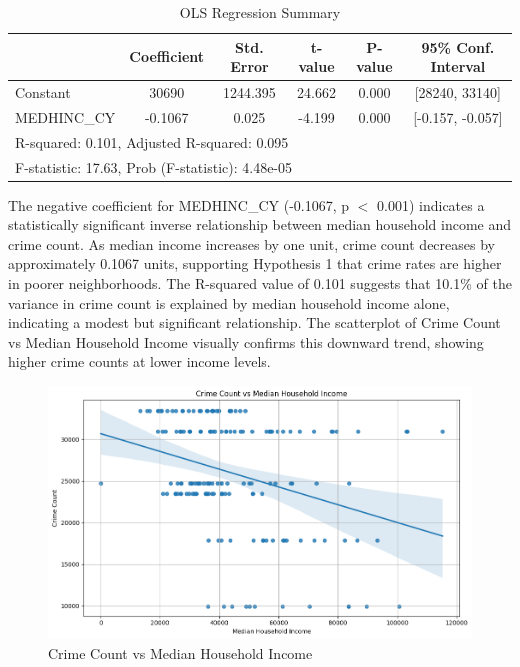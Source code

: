 \documentclass{report}
\begin{document}
\newpage
\begin{table}[h!]
\centering
\caption{OLS Regression Summary}
\label{tab:model1_summary}
\begin{tabular}{lccccc}
\toprule
 & Coefficient & Std. Error & t-value & P-value & 95\% Conf. Interval \\
\midrule
Constant & 30690 & 1244.395 & 24.662 & 0.000 & [28240, 33140] \\
MEDHINC\_CY & -0.1067 & 0.025 & -4.199 & 0.000 & [-0.157, -0.057] \\
\midrule
\multicolumn{6}{l}{R-squared: 0.101, Adjusted R-squared: 0.095} \\
\multicolumn{6}{l}{F-statistic: 17.63, Prob (F-statistic): 4.48e-05} \\
\bottomrule
\end{tabular}
\end{table}

\par The negative coefficient for MEDHINC\_CY (-0.1067, p $<$ 0.001) indicates a statistically significant inverse relationship between median household income and crime count. As median income increases by one unit, crime count decreases by approximately 0.1067 units, supporting Hypothesis 1 that crime rates are higher in poorer neighborhoods. The R-squared value of 0.101 suggests that 10.1\% of the variance in crime count is explained by median household income alone, indicating a modest but significant relationship. The scatterplot of Crime Count vs Median Household Income visually confirms this downward trend, showing higher crime counts at lower income levels.


\begin{figure}[h!]
  \begin{center}
    \advance\leftskip-3cm
    \advance\rightskip-3cm
    \includegraphics[keepaspectratio=true,scale=.6]{cime-count-income}
    \caption{Crime Count vs Median Household Income}
    \label{fig:cime-count-income}
  \end{center}
\end{figure}
\end{document}
